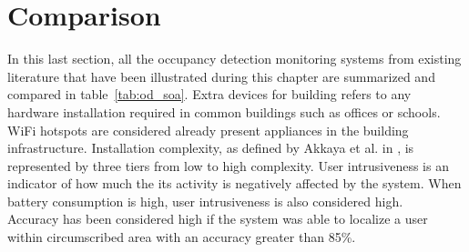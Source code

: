 
\section{Comparison}
\label{sec:comparison}

In this last section, all the occupancy detection monitoring systems from existing literature that have been illustrated during this chapter are summarized and compared in table~\ref{tab:od_soa}. Extra devices for building refers to any hardware installation required in common buildings such as offices or schools. WiFi hotspots are considered already present appliances in the building infrastructure. Installation complexity, as defined by Akkaya et al. in \cite{Akkaya2015}, is represented by three tiers from low to high complexity. User intrusiveness is an indicator of how much the its activity is negatively affected by the system. When battery consumption is high, user intrusiveness is also considered high.\\
Accuracy has been considered high if the system was able to localize a user within circumscribed area with an accuracy greater than 85\%. 
%
%
